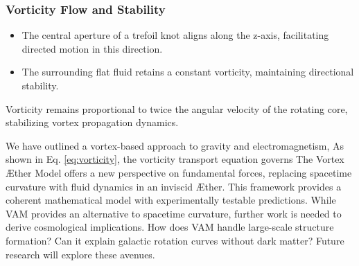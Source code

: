 \subsubsection*{Vorticity Flow and Stability}

\begin{itemize}
    \item The central aperture of a trefoil knot aligns along the z-axis, facilitating directed motion in this direction.
    \item The surrounding flat fluid retains a constant vorticity, maintaining directional stability.
\end{itemize}
Vorticity remains proportional to twice the angular velocity of the rotating core, stabilizing vortex propagation dynamics.

We have outlined a vortex-based approach to gravity and electromagnetism, As shown in Eq. \eqref{eq:vorticity}, the vorticity transport equation governs  The Vortex Æther Model offers a new perspective on fundamental forces,
replacing spacetime curvature with fluid dynamics in an inviscid Æther.
This framework provides a coherent mathematical model with experimentally testable predictions.
While VAM provides an alternative to spacetime curvature, further work is needed to derive cosmological implications.
How does VAM handle large-scale structure formation?
Can it explain galactic rotation curves without dark matter?
Future research will explore these avenues.